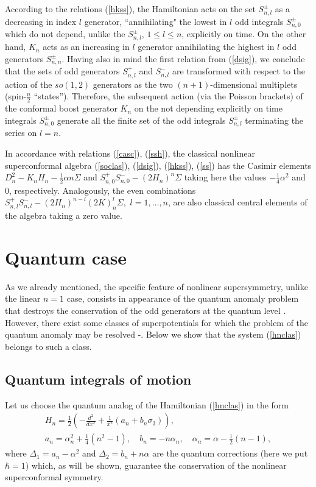 \documentclass[a4paper,12pt]{article}
\begin{document}
According to the relations (\ref{hkss}), the Hamiltonian
acts on the set  $S^\pm_{n,l}$
as a decreasing in index $l$ generator,
``annihilating" the lowest in $l$ odd integrals
$S^\pm_{n,0}$ which do not depend,
unlike the $S^\pm_{n,l}$, $1\leq l\leq n$,
explicitly on time.
On the other hand,
$K_n$ acts as an increasing in $l$
generator annihilating the highest in $l$ odd
generators $S^\pm_{n,n}$.
Having also in mind the first relation from
(\ref{dsig}),
we conclude that the sets of odd generators
$S^+_{n,l}$ and $S^-_{n,l}$ are transformed with respect
to the action of the $so(1,2)$ generators as the
two  $(n+1)$-dimensional multiplets
(spin-$\frac{n}{2}$ ``states'').
Therefore, the subsequent action (via the Poisson brackets)
of the conformal boost generator $K_n$
on the not depending explicitly on time
integrals $S^\pm_{n,0}$ generate all the
finite set of the odd integrals $S^\pm_{n,l}$
terminating the series on $l=n$.

In accordance with
relations (\ref{casc}), (\ref{ssh}),
the classical nonlinear
superconformal algebra
(\ref{soclas}), (\ref{dsig}), (\ref{hkss}),
(\ref{ss})
has the Casimir elements
$D_n^2-K_nH_n-\frac{1}{2}\alpha n \Sigma$ and
$S^+_{n,0}S^-_{n,0}-(2H_n)^n\Sigma$
taking here the values $-\frac{1}{4}\alpha^2$
and $0$, respectively.
Analogously, the even combinations
$
S^+_{n,l}S^-_{n,l}-(2H_n)^{n-l}(2K)_n^l\Sigma,
$
$l=1,\ldots,n$,
are also classical central elements of the
algebra taking a zero value.

\section{Quantum case}
As we already mentioned,
the specific feature  of
nonlinear
supersymmetry,
unlike the linear $n=1$ case,
consists in appearance of
the quantum anomaly problem that destroys
the conservation of the odd generators at the quantum level
\cite{P1,KP1}.
However, there exist some classes of
superpotentials for which the problem of the quantum
anomaly may be resolved \cite{KP1}-\cite{KP2}.
Below we show that the system (\ref{hnclas})
belongs to such a class.

\subsection{Quantum integrals of motion}

Let us choose the quantum analog of the  Hamiltonian
(\ref{hnclas})  in the form
\begin{eqnarray}
&H_n=\frac{1}{2}\left(-\frac{d^2}{dx^2}+
\frac{1}{x^2}(a_n +b_n\sigma_3)\right),&\label{hq}
\\
&
a_n=\alpha_n^2+\frac{1}{4}(n^2-1),\quad
b_n=-n\alpha_n,\quad
\alpha_n=\alpha-\frac{1}{2}(n-1),
&
\label{ab}
\end{eqnarray}
where $\Delta_1=a_n-\alpha^2$ and $\Delta_2=b_n+n\alpha$ are
the
quantum corrections \cite {KP1}
(here we put $\hbar=1$) which, as will be shown,
guarantee the conservation of the
nonlinear superconformal symmetry.
\end{document}
